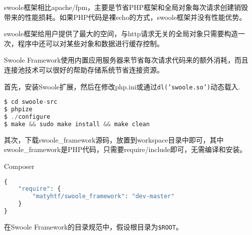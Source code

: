 swoole框架相比apache/fpm，主要是节省PHP框架和全局对象每次请求创建销毁带来的性能损耗。如果PHP代码是裸echo的方式，swoole框架并没有性能优势。

swoole框架给用户提供了最大的空间，与http请求无关的全局对象只需要构造一次，程序中还可以对某些对象和数据进行缓存控制。

Swoole Framework使用内置应用服务器来节省每次请求代码来的额外消耗，而且连接池技术可以很好的帮助存储系统节省连接资源。

首先，安装Swoole扩展，然后在修改php.ini或通过\texttt{dl('swoole.so')}动态载入.


\begin{lstlisting}[language=PHP]
$ cd swoole-src
$ phpize
$ ./configure
$ make && sudo make install && make clean
\end{lstlisting}

其次，下载swoole\_framework源码，放置到workspace目录中即可，其中swoole\_framework是PHP代码，只需要require/include即可，无需编译和安装。

\begin{example}
Composer
\begin{lstlisting}[language=PHP]
{
    "require": {
        "matyhtf/swoole_framework": "dev-master"
    }
}
\end{lstlisting}
\end{example}

在Swoole Framework的目录规范中，假设根目录为\texttt{\$ROOT}。

